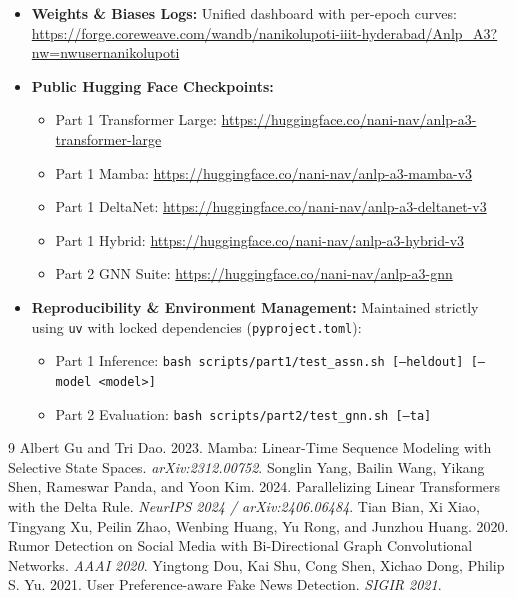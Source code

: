 \documentclass[12pt,a4paper]{article}
\begin{document}
\begin{itemize}[leftmargin=*]
    \item \textbf{Weights \& Biases Logs:} Unified dashboard with per-epoch curves: \url{https://forge.coreweave.com/wandb/nanikolupoti-iiit-hyderabad/Anlp_A3?nw=nwusernanikolupoti}
    \item \textbf{Public Hugging Face Checkpoints:}
    \begin{itemize}
        \item Part 1 Transformer Large: \url{https://huggingface.co/nani-nav/anlp-a3-transformer-large}
        \item Part 1 Mamba: \url{https://huggingface.co/nani-nav/anlp-a3-mamba-v3}
        \item Part 1 DeltaNet: \url{https://huggingface.co/nani-nav/anlp-a3-deltanet-v3}
        \item Part 1 Hybrid: \url{https://huggingface.co/nani-nav/anlp-a3-hybrid-v3}
        \item Part 2 GNN Suite: \url{https://huggingface.co/nani-nav/anlp-a3-gnn}
    \end{itemize}
    \item \textbf{Reproducibility \& Environment Management:} Maintained strictly using \texttt{uv} with locked dependencies (\texttt{pyproject.toml}):
    \begin{itemize}
        \item Part 1 Inference: \texttt{bash scripts/part1/test\_assn.sh [--heldout] [--model <model>]}
        \item Part 2 Evaluation: \texttt{bash scripts/part2/test\_gnn.sh [--ta]}
    \end{itemize}
\end{itemize}

\begin{thebibliography}{9}
 Albert Gu and Tri Dao. 2023. Mamba: Linear-Time Sequence Modeling with Selective State Spaces. \textit{arXiv:2312.00752}.
 Songlin Yang, Bailin Wang, Yikang Shen, Rameswar Panda, and Yoon Kim. 2024. Parallelizing Linear Transformers with the Delta Rule. \textit{NeurIPS 2024 / arXiv:2406.06484}.
 Tian Bian, Xi Xiao, Tingyang Xu, Peilin Zhao, Wenbing Huang, Yu Rong, and Junzhou Huang. 2020. Rumor Detection on Social Media with Bi-Directional Graph Convolutional Networks. \textit{AAAI 2020}.
 Yingtong Dou, Kai Shu, Cong Shen, Xichao Dong, Philip S. Yu. 2021. User Preference-aware Fake News Detection. \textit{SIGIR 2021}.
\end{thebibliography}
\end{document}
